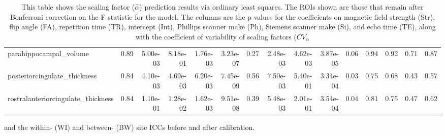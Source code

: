 \begin{table}
\begin{tabular}{lrrrrrrrrrrrrrr}
parahippocampal\_volume             &  0.89 &    5.00e-03 &     8.18e-01 &  1.76e-03 &     3.23e-07 &          0.27 &      2.48e-03 &  4.62e-03 &  3.87e-05 &  0.06 &  0.94 &    0.92 &  0.71 &    0.87 \\
posteriorcingulate\_thickness       &  0.84 &    4.10e-03 &     4.69e-03 &  6.20e-03 &     7.45e-09 &          0.56 &      7.50e-03 &  5.40e-01 &  3.34e-04 &  0.03 &  0.75 &    0.68 &  0.43 &    0.57 \\
rostralanteriorcingulate\_thickness &  0.84 &    1.10e-01 &     1.28e-02 &  1.62e-03 &     9.51e-08 &          0.39 &      5.48e-03 &  2.01e-01 &  3.54e-04 &  0.04 &  0.81 &    0.75 &  0.47 &    0.62 \\
\bottomrule
\end{tabular}
\label{tab:alpha_predict}
\caption{This table shows the scaling factor ($\hat{\alpha}$)  prediction results via ordinary least squares. The ROIs shown are those that remain after Bonferroni correction on the F statistic for the model. The columns are the p values for the coefficients on magnetic field strength (Str), flip angle (FA), repetition time (TR), intercept (Int), Phillips scanner make (Ph), Siemens scanner make (Si), and echo time (TE), along with the coefficient of variability of scaling factors ($CV_\alpha$} and the within- (WI) and between- (BW) site ICCs before and after calibration.
\end{table}
